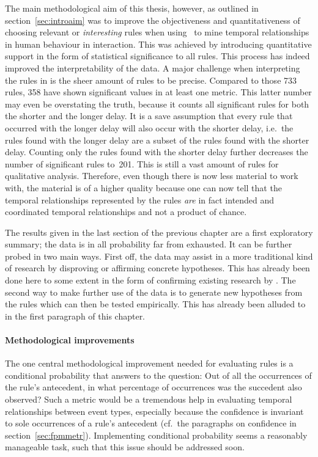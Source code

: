 The main methodological aim of this thesis, however, as outlined in section~\ref{sec:introaim} was to improve the objectiveness and quantitativeness of choosing relevant or \emph{interesting} rules when using \fpmlower\ to mine temporal relationships in human behaviour in interaction.
This was achieved by introducing quantitative support in the form of statistical significance to all rules.
This process has indeed improved the interpretability of the data.
A major challenge when interpreting the rules in \citet{rohlfing_multimodal_underreview} is the sheer amount of rules to be precise.
Compared to those 733 rules, 358 have shown significant values in at least one metric.
This latter number may even be overstating the truth, because it counts all significant rules for both the shorter and the longer delay.
It is a save assumption that every rule that occurred with the longer delay will also occur with the shorter delay, i.e.~the rules found with the longer delay are a subset of the rules found with the shorter delay.
Counting only the rules found with the shorter delay further decreases the number of significant rules to~201.
This is still a vast amount of rules for qualitative analysis.
Therefore, even though there is now less material to work with, the material is of a higher quality because one can now tell that the temporal relationships represented by the rules \emph{are} in fact intended and coordinated temporal relationships and not a product of chance.

The results given in the last section of the previous chapter are a first exploratory summary; the data is in all probability far from exhausted.
It can be further probed in two main ways.
First off, the data may assist in a more traditional kind of research by disproving or affirming concrete hypotheses.
This has already been done here to some extent in the form of confirming existing research by \citet{nomikou_educating_2013}.
The second way to make further use of the data is to generate new hypotheses from the rules which can then be tested empirically.
This has already been alluded to in the first paragraph of this chapter.

\paragraph{Methodological improvements}
The one central methodological improvement needed for evaluating rules is a conditional probability that answers to the question:
Out of all the occurrences of the rule's antecedent, in what percentage of occurrences was the succedent also observed?
Such a metric would be a tremendous help in evaluating temporal relationships between event types, especially because the confidence is invariant to sole occurrences of a rule's antecedent (cf.~the paragraphs on confidence in section~\ref{sec:fpmmetr}).
Implementing conditional probability seems a reasonably manageable task, such that this issue should be addressed soon.

